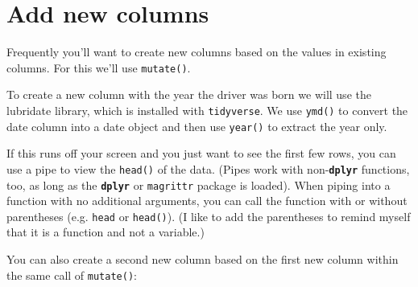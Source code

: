 \documentclass[]{book}
\newenvironment{Shaded}{\begin{snugshade}}{\end{snugshade}}
\newcommand{\KeywordTok}[1]{\textcolor[rgb]{0.13,0.29,0.53}{\textbf{#1}}}
\newcommand{\DataTypeTok}[1]{\textcolor[rgb]{0.13,0.29,0.53}{#1}}
\newcommand{\DecValTok}[1]{\textcolor[rgb]{0.00,0.00,0.81}{#1}}
\newcommand{\StringTok}[1]{\textcolor[rgb]{0.31,0.60,0.02}{#1}}
\newcommand{\OperatorTok}[1]{\textcolor[rgb]{0.81,0.36,0.00}{\textbf{#1}}}
\newcommand{\NormalTok}[1]{#1}
\theoremstyle{definition}
\theoremstyle{definition}
\theoremstyle{definition}
\theoremstyle{remark}
\begin{document}
\section{Add new columns}\label{add-new-columns}

Frequently you'll want to create new columns based on the values in
existing columns. For this we'll use \texttt{mutate()}.

To create a new column with the year the driver was born we will use the
lubridate library, which is installed with \texttt{tidyverse}. We use
\texttt{ymd()} to convert the date column into a date object and then
use \texttt{year()} to extract the year only.

\begin{Shaded}
\end{Shaded}

If this runs off your screen and you just want to see the first few
rows, you can use a pipe to view the \texttt{head()} of the data. (Pipes
work with non-\textbf{\texttt{dplyr}} functions, too, as long as the
\textbf{\texttt{dplyr}} or \texttt{magrittr} package is loaded). When
piping into a function with no additional arguments, you can call the
function with or without parentheses (e.g. \texttt{head} or
\texttt{head()}). (I like to add the parentheses to remind myself that
it is a function and not a variable.)

\begin{Shaded}
\end{Shaded}

You can also create a second new column based on the first new column
within the same call of \texttt{mutate()}:

\begin{Shaded}
\end{Shaded}
\end{document}
